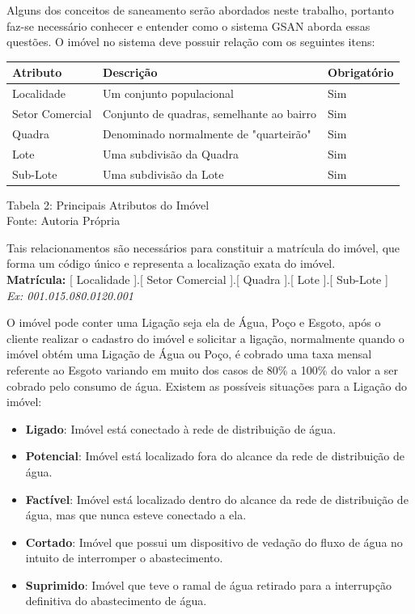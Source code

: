 Alguns dos conceitos de saneamento serão abordados neste trabalho, portanto faz-se necessário conhecer e entender como o sistema GSAN aborda essas questões.
O imóvel no sistema deve possuir relação com os seguintes itens:


\begin{table}[htb]
	\center
	\footnotesize
	\begin{tabular}{|p{3cm}|p{7cm}|p{2.5cm}|} \hline
		\textbf{Atributo} & \textbf{Descrição} & \textbf{Obrigatório}  \\ \hline
		Localidade & Um conjunto populacional & Sim \\	\hline
		Setor Comercial & Conjunto de quadras, semelhante ao bairro & Sim \\ \hline
		Quadra & Denominado normalmente de "quarteirão" & Sim \\ \hline			
		Lote &  Uma subdivisão da Quadra & Sim \\ \hline
		Sub-Lote &  Uma subdivisão da Lote & Sim \\ \hline
	\end{tabular}
\end{table}
\begin{center}
	Tabela 2: Principais Atributos do Imóvel \\
	Fonte: Autoria Própria
\end{center}


Tais relacionamentos são necessários para constituir a matrícula do imóvel, que forma um código único e representa a localização exata do imóvel.\\
\textbf{Matrícula:} [ Localidade ].[ Setor Comercial ].[ Quadra ].[ Lote ].[ Sub-Lote ]  \\
\textit{Ex: 001.015.080.0120.001}

O imóvel pode conter uma Ligação seja ela de Água, Poço e Esgoto, após o cliente realizar o cadastro do imóvel e solicitar a ligação, normalmente quando o imóvel obtém uma Ligação de Água ou Poço, é cobrado uma taxa mensal referente ao Esgoto variando em muito dos casos de 80\% a 100\% do valor a ser cobrado pelo consumo de água. Existem as possíveis situações para a Ligação do imóvel:

\begin{itemize}
	\item \textbf{Ligado}: Imóvel está conectado à rede de distribuição de água.
	\item \textbf{Potencial}: Imóvel está localizado fora do alcance da rede de distribuição de água.
	\item \textbf{Factível}: Imóvel está localizado dentro do alcance da rede de distribuição de água, mas que nunca esteve conectado a ela.
	\item \textbf{Cortado}: Imóvel que possui um dispositivo de vedação do fluxo de água no intuito de interromper o abastecimento.
	\item \textbf{Suprimido}: Imóvel que teve o ramal de água retirado para a interrupção definitiva do abastecimento de água.	
\end{itemize}

